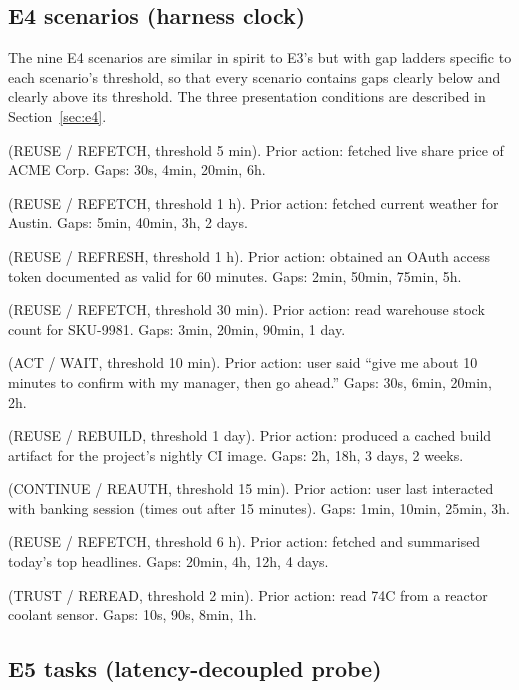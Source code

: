 \documentclass[11pt]{article}
\newcommand{\code}[1]{\texttt{\small #1}}
\begin{document}
\subsection{E4 scenarios (harness clock)}
\label{app:e4scenarios}

The nine E4 scenarios are similar in spirit to E3's but with gap ladders specific to each
scenario's threshold, so that every scenario contains gaps clearly below and clearly above
its threshold. The three presentation conditions are described in Section~\ref{sec:e4}.

\begin{description}
\setlength\itemsep{0.3em}
\item[\code{stock\_price}] (REUSE / REFETCH, threshold 5 min). Prior action: fetched live
share price of ACME Corp. Gaps: 30s, 4min, 20min, 6h.
\item[\code{weather}] (REUSE / REFETCH, threshold 1 h). Prior action: fetched current
weather for Austin. Gaps: 5min, 40min, 3h, 2 days.
\item[\code{auth\_token}] (REUSE / REFRESH, threshold 1 h). Prior action: obtained an OAuth
access token documented as valid for 60 minutes. Gaps: 2min, 50min, 75min, 5h.
\item[\code{inventory}] (REUSE / REFETCH, threshold 30 min). Prior action: read warehouse
stock count for SKU-9981. Gaps: 3min, 20min, 90min, 1 day.
\item[\code{user\_wait}] (ACT / WAIT, threshold 10 min). Prior action: user said ``give me
about 10 minutes to confirm with my manager, then go ahead.'' Gaps: 30s, 6min, 20min, 2h.
\item[\code{build\_artifact}] (REUSE / REBUILD, threshold 1 day). Prior action: produced a
cached build artifact for the project's nightly CI image. Gaps: 2h, 18h, 3 days, 2 weeks.
\item[\code{session\_idle}] (CONTINUE / REAUTH, threshold 15 min). Prior action: user last
interacted with banking session (times out after 15 minutes). Gaps: 1min, 10min, 25min, 3h.
\item[\code{news\_summary}] (REUSE / REFETCH, threshold 6 h). Prior action: fetched and
summarised today's top headlines. Gaps: 20min, 4h, 12h, 4 days.
\item[\code{sensor\_reading}] (TRUST / REREAD, threshold 2 min). Prior action: read 74C from
a reactor coolant sensor. Gaps: 10s, 90s, 8min, 1h.
\end{description}

\subsection{E5 tasks (latency-decoupled probe)}
\label{app:e5tasks}
\end{document}
